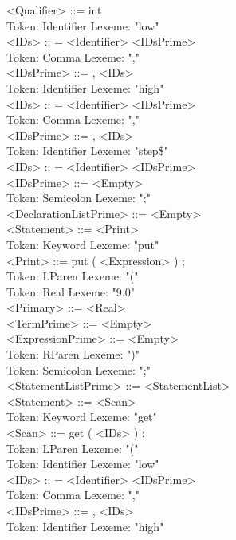 \documentclass[11pt]{article}
\begin{document}
        <Qualifier> ::= int \\
Token: Identifier        Lexeme: "low" \\
        <IDs> :: = <Identifier> <IDsPrime> \\
Token: Comma     Lexeme: "," \\
        <IDsPrime> ::= , <IDs> \\
Token: Identifier        Lexeme: "high" \\
        <IDs> :: = <Identifier> <IDsPrime> \\
Token: Comma     Lexeme: "," \\
        <IDsPrime> ::= , <IDs> \\
Token: Identifier        Lexeme: "step\$" \\
        <IDs> :: = <Identifier> <IDsPrime> \\
        <IDsPrime> ::= <Empty> \\
Token: Semicolon         Lexeme: ";" \\
        <DeclarationListPrime> ::= <Empty> \\
        <Statement> ::= <Print> \\
Token: Keyword   Lexeme: "put" \\
        <Print> ::= put ( <Expression> ) ; \\
Token: LParen    Lexeme: "(" \\
Token: Real      Lexeme: "9.0" \\
        <Primary> ::= <Real> \\
        <TermPrime> ::= <Empty> \\
        <ExpressionPrime> ::= <Empty> \\
Token: RParen    Lexeme: ")" \\
Token: Semicolon         Lexeme: ";" \\
        <StatementListPrime> ::= <StatementList> \\
        <Statement> ::= <Scan> \\
Token: Keyword   Lexeme: "get" \\
        <Scan> ::= get ( <IDs> ) ; \\
Token: LParen    Lexeme: "(" \\
Token: Identifier        Lexeme: "low" \\
        <IDs> :: = <Identifier> <IDsPrime> \\
Token: Comma     Lexeme: "," \\
        <IDsPrime> ::= , <IDs> \\
Token: Identifier        Lexeme: "high" \\
\end{document}
